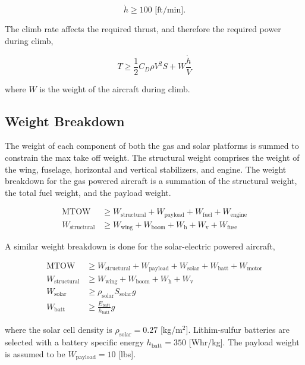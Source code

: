 \begin{equation}
    \label{e:climbrate}
    \dot{h} \geq 100 \text{ [ft/min]}.
\end{equation}

The climb rate affects the required thrust, and therefore the required power during climb, 

\begin{equation}
    \label{e:climb}
    T \geq \frac{1}{2} C_D \rho V^2 S + W \frac{\dot{h}}{V}
\end{equation}

where $W$ is the weight of the aircraft during climb.  

\subsection{Weight Breakdown}

The weight of each component of both the gas and solar platforms is summed to constrain the max take off weight.  
The structural weight comprises the weight of the wing, fuselage, horizontal and vertical stabilizers, and engine. 
The weight breakdown for the gas powered aircraft is a summation of the structural weight, the total fuel weight, and the payload weight. 

\begin{align}
    \label{e:weightmtow}
    \text{MTOW} &\geq W_{\text{structural}}  + W_{\text{payload}} + W_{\text{fuel}} + W_{\text{engine}} \\
    W_{\text{structural}} &\geq W_{\text{wing}} + W_{\text{boom}} + W_{\text{h}}+ W_{\text{v}} + W_{\text{fuse}}
\end{align}

A similar weight breakdown is done for the solar-electric powered aircraft, 

\begin{align}
    \label{e:weightsmtow}
    \text{MTOW} &\geq W_{\text{structural}} + W_{\text{payload}} + W_{\text{solar}} + W_{\text{batt}} + W_{\text{motor}} \\
    W_{\text{structural}} &\geq W_{\text{wing}} + W_{\text{boom}} + W_{\text{h}}+ W_{\text{v}} \\
    W_{\text{solar}} &\geq \rho_{\text{solar}} S_{\text{solar}} g \\
    W_{\text{batt}} &\geq \frac{E_{\text{batt}}}{h_{\text{batt}}} g
\end{align}

where the solar cell density is $\rho_{\text{solar}} = 0.27$ [kg/m$^2$].\cite{solartech}\cite{solarparam}
Lithim-sulfur batteries are selected with a battery specific energy $h_{\text{batt}} = 350$ [Whr/kg].\cite{lithiumsul}
The payload weight is assumed to be $W_{\text{payload}} = 10$ [lbs].

